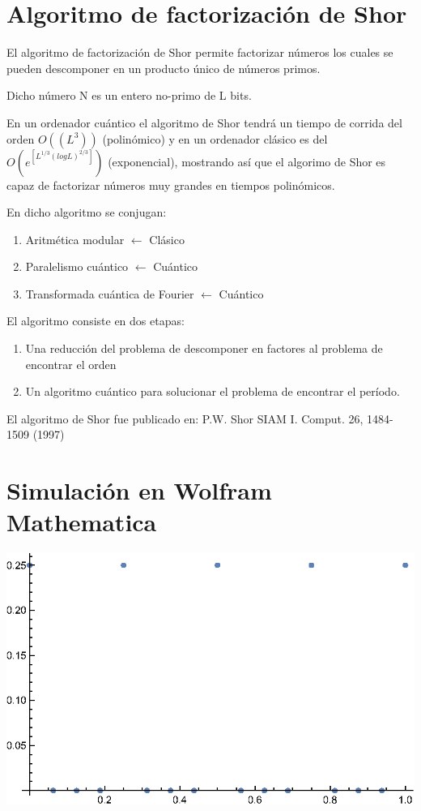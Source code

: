 \section{Algoritmo de factorización de Shor}

El algoritmo de factorización de Shor permite factorizar números los cuales se pueden descomponer en un producto único de números primos.

Dicho número N es un entero no-primo de L bits.

En un ordenador cuántico el algoritmo de Shor tendrá un tiempo de corrida del orden $O((L^3))$ (polinómico) y en un ordenador clásico es del $O(e^[L^{1/3} (log L)^{2/3}])$ (exponencial), mostrando así que el algorimo de Shor es capaz de factorizar números muy grandes en tiempos polinómicos.

En dicho algoritmo se conjugan:

\begin{enumerate}
    \item Aritmética modular $\leftarrow$ Clásico
    \item Paralelismo cuántico $\leftarrow$ Cuántico
    \item Transformada cuántica de Fourier $\leftarrow$ Cuántico
\end{enumerate}

El algoritmo consiste en dos etapas:

\begin{enumerate}
    \item Una reducción del problema de descomponer en factores al problema de encontrar el orden
    \item Un algoritmo cuántico para solucionar el problema de encontrar el período.
\end{enumerate}

El algoritmo de Shor fue publicado en: P.W. Shor SIAM I. Comput. 26, 1484-1509 (1997)

\section{Simulación en Wolfram Mathematica}

\includegraphics{img/Shor_gr1.eps}

